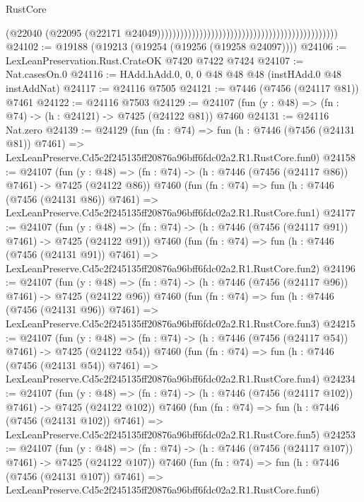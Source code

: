 \begin{lexlean}{RustCore}
\begin{coremodule}
                                                                                            (@22040
                                                                                              (@22095
                                                                                                (@22171
                                                                                                  @24049)))))))))))))))))))))))))))))))))))))))))))))))
@24102 := @19188 (@19213 (@19254 (@19256 (@19258 @24097))))
@24106 := LexLeanPreservation.Rust.CrateOK @7420 @7422 @7424
@24107 := Nat.casesOn.{0}
@24116 := HAdd.hAdd.{0, 0, 0} @48 @48 @48 (instHAdd.{0} @48 instAddNat)
@24117 := @24116 @7505
@24121 := @7446 (@7456 (@24117 @81)) @7461
@24122 := @24116 @7503
@24129 := @24107 (fun (y : @48) => (fn : @74) -> (h : @24121) -> @7425 (@24122 @81)) @7460
@24131 := @24116 Nat.zero
@24139 := @24129
    (fun (fn : @74) =>
    fun (h : @7446 (@7456 (@24131 @81)) @7461) =>
    LexLeanPreserve.Cd5c2f245135ff20876a96bff6fdc02a2.R1.RustCore.fun0)
@24158 := @24107
    (fun (y : @48) => (fn : @74) -> (h : @7446 (@7456 (@24117 @86)) @7461) -> @7425 (@24122 @86))
    @7460
    (fun (fn : @74) =>
    fun (h : @7446 (@7456 (@24131 @86)) @7461) =>
    LexLeanPreserve.Cd5c2f245135ff20876a96bff6fdc02a2.R1.RustCore.fun1)
@24177 := @24107
    (fun (y : @48) => (fn : @74) -> (h : @7446 (@7456 (@24117 @91)) @7461) -> @7425 (@24122 @91))
    @7460
    (fun (fn : @74) =>
    fun (h : @7446 (@7456 (@24131 @91)) @7461) =>
    LexLeanPreserve.Cd5c2f245135ff20876a96bff6fdc02a2.R1.RustCore.fun2)
@24196 := @24107
    (fun (y : @48) => (fn : @74) -> (h : @7446 (@7456 (@24117 @96)) @7461) -> @7425 (@24122 @96))
    @7460
    (fun (fn : @74) =>
    fun (h : @7446 (@7456 (@24131 @96)) @7461) =>
    LexLeanPreserve.Cd5c2f245135ff20876a96bff6fdc02a2.R1.RustCore.fun3)
@24215 := @24107
    (fun (y : @48) => (fn : @74) -> (h : @7446 (@7456 (@24117 @54)) @7461) -> @7425 (@24122 @54))
    @7460
    (fun (fn : @74) =>
    fun (h : @7446 (@7456 (@24131 @54)) @7461) =>
    LexLeanPreserve.Cd5c2f245135ff20876a96bff6fdc02a2.R1.RustCore.fun4)
@24234 := @24107
    (fun (y : @48) => (fn : @74) -> (h : @7446 (@7456 (@24117 @102)) @7461) -> @7425 (@24122 @102))
    @7460
    (fun (fn : @74) =>
    fun (h : @7446 (@7456 (@24131 @102)) @7461) =>
    LexLeanPreserve.Cd5c2f245135ff20876a96bff6fdc02a2.R1.RustCore.fun5)
@24253 := @24107
    (fun (y : @48) => (fn : @74) -> (h : @7446 (@7456 (@24117 @107)) @7461) -> @7425 (@24122 @107))
    @7460
    (fun (fn : @74) =>
    fun (h : @7446 (@7456 (@24131 @107)) @7461) =>
    LexLeanPreserve.Cd5c2f245135ff20876a96bff6fdc02a2.R1.RustCore.fun6)

\end{coremodule}
\end{lexlean}
